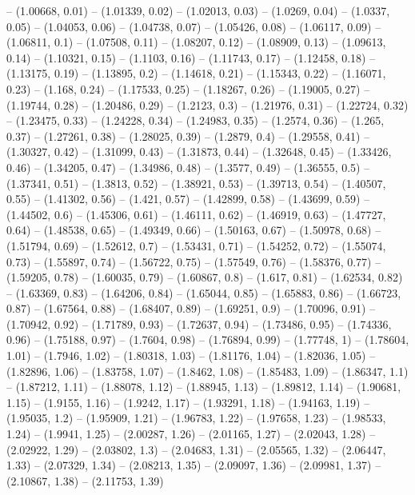-- (1.00668, 0.01)
-- (1.01339, 0.02)
-- (1.02013, 0.03)
-- (1.0269, 0.04)
-- (1.0337, 0.05)
-- (1.04053, 0.06)
-- (1.04738, 0.07)
-- (1.05426, 0.08)
-- (1.06117, 0.09)
-- (1.06811, 0.1)
-- (1.07508, 0.11)
-- (1.08207, 0.12)
-- (1.08909, 0.13)
-- (1.09613, 0.14)
-- (1.10321, 0.15)
-- (1.1103, 0.16)
-- (1.11743, 0.17)
-- (1.12458, 0.18)
-- (1.13175, 0.19)
-- (1.13895, 0.2)
-- (1.14618, 0.21)
-- (1.15343, 0.22)
-- (1.16071, 0.23)
-- (1.168, 0.24)
-- (1.17533, 0.25)
-- (1.18267, 0.26)
-- (1.19005, 0.27)
-- (1.19744, 0.28)
-- (1.20486, 0.29)
-- (1.2123, 0.3)
-- (1.21976, 0.31)
-- (1.22724, 0.32)
-- (1.23475, 0.33)
-- (1.24228, 0.34)
-- (1.24983, 0.35)
-- (1.2574, 0.36)
-- (1.265, 0.37)
-- (1.27261, 0.38)
-- (1.28025, 0.39)
-- (1.2879, 0.4)
-- (1.29558, 0.41)
-- (1.30327, 0.42)
-- (1.31099, 0.43)
-- (1.31873, 0.44)
-- (1.32648, 0.45)
-- (1.33426, 0.46)
-- (1.34205, 0.47)
-- (1.34986, 0.48)
-- (1.3577, 0.49)
-- (1.36555, 0.5)
-- (1.37341, 0.51)
-- (1.3813, 0.52)
-- (1.38921, 0.53)
-- (1.39713, 0.54)
-- (1.40507, 0.55)
-- (1.41302, 0.56)
-- (1.421, 0.57)
-- (1.42899, 0.58)
-- (1.43699, 0.59)
-- (1.44502, 0.6)
-- (1.45306, 0.61)
-- (1.46111, 0.62)
-- (1.46919, 0.63)
-- (1.47727, 0.64)
-- (1.48538, 0.65)
-- (1.49349, 0.66)
-- (1.50163, 0.67)
-- (1.50978, 0.68)
-- (1.51794, 0.69)
-- (1.52612, 0.7)
-- (1.53431, 0.71)
-- (1.54252, 0.72)
-- (1.55074, 0.73)
-- (1.55897, 0.74)
-- (1.56722, 0.75)
-- (1.57549, 0.76)
-- (1.58376, 0.77)
-- (1.59205, 0.78)
-- (1.60035, 0.79)
-- (1.60867, 0.8)
-- (1.617, 0.81)
-- (1.62534, 0.82)
-- (1.63369, 0.83)
-- (1.64206, 0.84)
-- (1.65044, 0.85)
-- (1.65883, 0.86)
-- (1.66723, 0.87)
-- (1.67564, 0.88)
-- (1.68407, 0.89)
-- (1.69251, 0.9)
-- (1.70096, 0.91)
-- (1.70942, 0.92)
-- (1.71789, 0.93)
-- (1.72637, 0.94)
-- (1.73486, 0.95)
-- (1.74336, 0.96)
-- (1.75188, 0.97)
-- (1.7604, 0.98)
-- (1.76894, 0.99)
-- (1.77748, 1)
-- (1.78604, 1.01)
-- (1.7946, 1.02)
-- (1.80318, 1.03)
-- (1.81176, 1.04)
-- (1.82036, 1.05)
-- (1.82896, 1.06)
-- (1.83758, 1.07)
-- (1.8462, 1.08)
-- (1.85483, 1.09)
-- (1.86347, 1.1)
-- (1.87212, 1.11)
-- (1.88078, 1.12)
-- (1.88945, 1.13)
-- (1.89812, 1.14)
-- (1.90681, 1.15)
-- (1.9155, 1.16)
-- (1.9242, 1.17)
-- (1.93291, 1.18)
-- (1.94163, 1.19)
-- (1.95035, 1.2)
-- (1.95909, 1.21)
-- (1.96783, 1.22)
-- (1.97658, 1.23)
-- (1.98533, 1.24)
-- (1.9941, 1.25)
-- (2.00287, 1.26)
-- (2.01165, 1.27)
-- (2.02043, 1.28)
-- (2.02922, 1.29)
-- (2.03802, 1.3)
-- (2.04683, 1.31)
-- (2.05565, 1.32)
-- (2.06447, 1.33)
-- (2.07329, 1.34)
-- (2.08213, 1.35)
-- (2.09097, 1.36)
-- (2.09981, 1.37)
-- (2.10867, 1.38)
-- (2.11753, 1.39)

